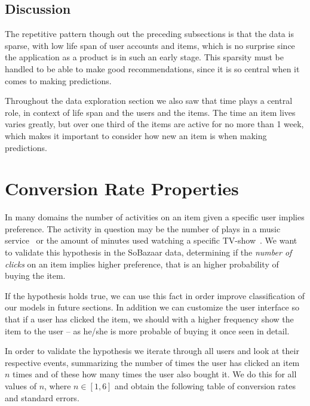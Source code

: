 \subsection{Discussion}
    The repetitive pattern though out the preceding subsections is that the data is sparse, with low life span of user accounts and items, which is no surprise since the application as a product is in such an early stage.
    This sparsity must be handled to be able to make good recommendations, since it is so central when it comes to making predictions.

    Throughout the data exploration section we also saw that time plays a central role, in context of life span and the users and the items.
    The time an item lives varies greatly, but over one third of the items are active for no more than 1 week, which makes it important to consider how new an item is when making predictions.


\section{Conversion Rate Properties}
\label{sec:conv-rate}

In many domains the number of activities on an item given a specific user
implies preference. The activity in question may be the number of plays in a
music service~\cite{parra2011walk} or the amount of minutes used watching a
specific TV-show~\cite{study-on-implicit-tv}. We want to validate this
hypothesis in the SoBazaar data, determining if the \textit{number of clicks}
on an item implies higher preference, that is an higher probability of buying
the item.

If the hypothesis holds true, we can use this fact in order improve
classification of our models in future sections. In addition we can customize
the user interface so that if a user has clicked the item, we should with a
higher frequency show the item to the user -- as he/she is more probable of
buying it once seen in detail.

In order to validate the hypothesis we iterate through all users and look at
their respective events, summarizing the number of times the user has clicked
an item $n$ times and of these how many times the user also bought it. We do
this for all values of $n$, where $n \in [1,6]$ and obtain the following table
of conversion rates and standard errors.

